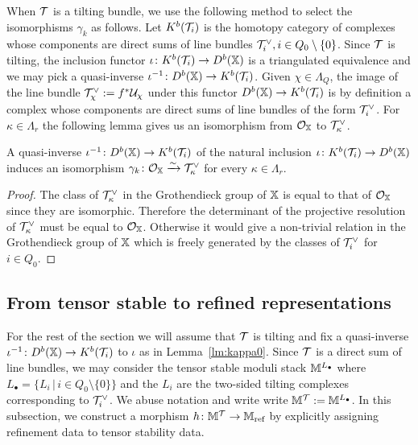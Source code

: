 \documentclass[12pt]{amsart}
\begin{document}
When $\mathcal{T}$ is a tilting bundle, we use the following method to select the isomorphisms $\gamma_k$ as follows. Let $K^b(\mathcal{T}_i)$ is the homotopy category of complexes whose components are direct sums of line bundles $\mathcal{T}_i^\vee, i \in Q_0 \setminus \{0\}$. Since $\mathcal{T}$ is tilting, the inclusion functor $\iota \colon K^b(\mathcal{T}_i) \rightarrow D^b(\mathbb{X})$ is a triangulated equivalence and we may pick a quasi-inverse $\iota^{-1} \colon D^b(\mathbb{X}) \to K^b(\mathcal{T}_i)$. 
Given $\chi \in \Lambda_{Q}$, the image of the line bundle $\mathcal{T}_\chi^\vee:= f^* \mathcal{U}_\chi$ under this functor $D^b(\mathbb{X}) \rightarrow K^b(\mathcal{T}_i)$ is by definition a complex whose components are direct sums of line bundles of the form $\mathcal{T}_i^\vee$.
For $\kappa \in \Lambda_r$ the following lemma gives us an isomorphism from $\mathcal{O}_{\mathbb{X}}$ to $\mathcal{T}_\kappa^\vee$.

\begin{lemma}\label{lm:kappa0}
A quasi-inverse $\iota^{-1} \colon D^b(\mathbb{X}) \rightarrow K^b(\mathcal{T}_i)$ of the natural inclusion $\iota\colon K^b(\mathcal{T}_i) \rightarrow D^b(\mathbb{X})$ induces an isomorphism $\gamma_k\colon \mathcal{O}_{\mathbb{X}} \xrightarrow{\sim}\mathcal{T}_\kappa^\vee$ for every  $\kappa \in \Lambda_r$.
\end{lemma}

\begin{proof}
The class of $\mathcal{T}_\kappa^\vee$ in the Grothendieck group of $\mathbb{X}$ is equal to that of $\mathcal{O}_{\mathbb{X}}$ since they are isomorphic.
Therefore the determinant of the projective resolution of $\mathcal{T}_\kappa^\vee$ must be equal to $\mathcal{O}_{\mathbb{X}}$. 
Otherwise it would give a non-trivial relation in the Grothendieck group of $\mathbb{X}$ which is freely generated by the classes of $\mathcal{T}_i^\vee$ for $i\in Q_0$.
\end{proof}

\subsection{From tensor stable to refined representations} \label{ssc:pictoref}
For the rest of the section we will assume that $\mathcal{T}$ is tilting and fix a quasi-inverse $\iota^{-1} \colon D^b(\mathbb{X}) \rightarrow K^b(\mathcal{T}_i)$ to $\iota$ as in Lemma~\ref{lm:kappa0}. Since $\mathcal{T}$ is a direct sum of line bundles, we may consider the tensor stable moduli stack $\mathbb{M}^{L_{\bullet}}$ where $L_{\bullet} = \{ L_i \,|\, i \in Q_0 \setminus \{0\}\}$ and the $L_i$ are the two-sided tilting complexes corresponding to $\mathcal{T}_i^\vee$. We abuse notation and write write $\mathbb{M}^{\mathcal{T}}:= \mathbb{M}^{L_{\bullet}}$. 
In this subsection, we construct a morphism $h \colon \mathbb{M}^{\mathcal{T}} \to \mathbb{M}_{\text{ref}}$ by explicitly assigning refinement data to tensor stability data.
\end{document}
